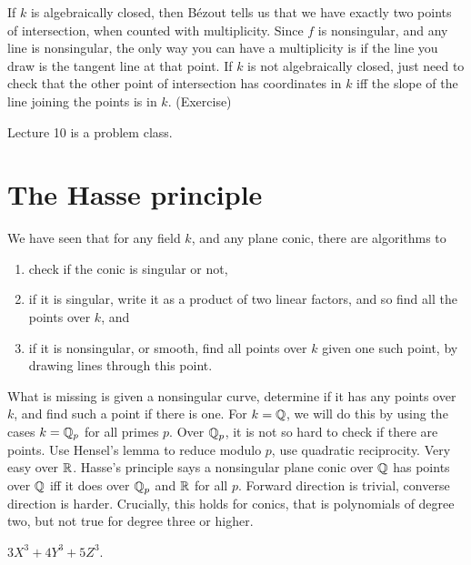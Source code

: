 \begin{note*}
If $ k $ is algebraically closed, then Bézout tells us that we have exactly two points of intersection, when counted with multiplicity. Since $ f $ is nonsingular, and any line is nonsingular, the only way you can have a multiplicity is if the line you draw is the tangent line at that point. If $ k $ is not algebraically closed, just need to check that the other point of intersection has coordinates in $ k $ iff the slope of the line joining the points is in $ k $. (Exercise)
\end{note*}


Lecture 10 is a problem class.

\pagebreak

\section{The Hasse principle}


We have seen that for any field $ k $, and any plane conic, there are algorithms to
\begin{enumerate}
\item check if the conic is singular or not,
\item if it is singular, write it as a product of two linear factors, and so find all the points over $ k $, and
\item if it is nonsingular, or smooth, find all points over $ k $ given one such point, by drawing lines through this point.
\end{enumerate}
What is missing is given a nonsingular curve, determine if it has any points over $ k $, and find such a point if there is one. For $ k = \mathbb{Q} $, we will do this by using the cases $ k = \mathbb{Q}_p $ for all primes $ p $. Over $ \mathbb{Q}_p $, it is not so hard to check if there are points. Use Hensel's lemma to reduce modulo $ p $, use quadratic reciprocity. Very easy over $ \mathbb{R} $. Hasse's principle says a nonsingular plane conic over $ \mathbb{Q} $ has points over $ \mathbb{Q} $ iff it does over $ \mathbb{Q}_p $ and $ \mathbb{R} $ for all $ p $. Forward direction is trivial, converse direction is harder. Crucially, this holds for conics, that is polynomials of degree two, but not true for degree three or higher.

\begin{example*}
$ 3X^3 + 4Y^3 + 5Z^3 $.
\end{example*}

